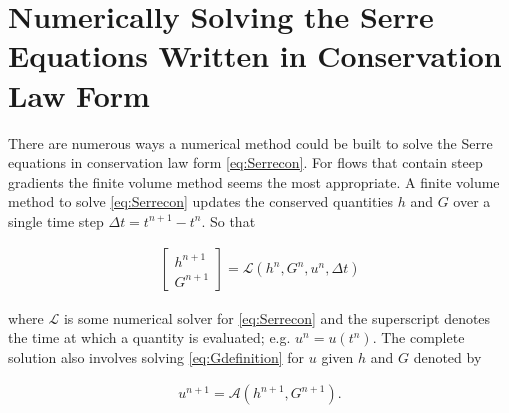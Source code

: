 \documentclass[SingleSpace,12pt,Proceedings]{Serre_ASCE}
\begin{document}
\section{Numerically Solving the Serre Equations Written in Conservation Law Form}
\label{section:Solving the Serre Equations Written in Conservation Law Form}
There are numerous ways a numerical method could be built to solve the Serre equations in conservation law form \eqref{eq:Serrecon}. For flows that contain steep gradients the finite volume method seems the most appropriate. A finite volume method to solve \eqref{eq:Serrecon} updates the conserved quantities $h$ and $G$ over a single time step $\Delta t = t^{n+1}-t^{n}$. So that
\begin{linenomath*}
\begin{gather}
\left[\begin{array}{c}
 h^{n+1} \\
 G^{n+1} \end{array}\right] = \mathcal{L}(h^{n},G^{n},u^n,\Delta t)
\label{eq:L}
\end{gather}
\end{linenomath*}
where $\mathcal{L}$ is some numerical solver for \eqref{eq:Serrecon} and the superscript denotes the time at which a quantity is evaluated; e.g. $u^n = u(t^n)$. The complete solution also involves solving \eqref{eq:Gdefinition} for $u$ given $h$ and $G$ denoted by 
\begin{linenomath*}
\begin{gather}
u^{n+1} = \mathcal{A}(h^{n+1},G^{n+1}) .
\label{eq:A}
\end{gather}
\end{linenomath*}
\end{document}
